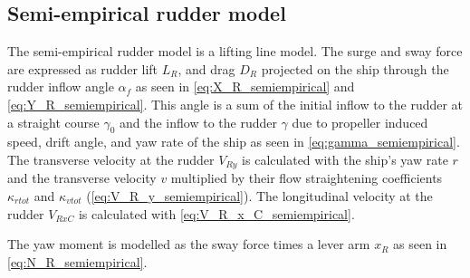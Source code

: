 \subsection{Semi-empirical rudder model}
\label{sec:semiempirical_rudder_model}
The semi-empirical rudder model is a lifting line model. The surge and sway force are expressed as rudder lift $L_R$, and drag $D_R$ projected on the ship through the rudder inflow angle $\alpha_f$ as seen in \autoref{eq:X_R_semiempirical} and \autoref{eq:Y_R_semiempirical}.
This angle is a sum of the initial inflow to the rudder at a straight course $\gamma_0$ and the inflow to the rudder $\gamma$ due to propeller induced speed, drift angle, and yaw rate of the ship as seen in \autoref{eq:gamma_semiempirical}.
\begin{equation}
    \label{eq:X_R_semiempirical}
    
\end{equation}
%
\begin{equation}
    \label{eq:Y_R_semiempirical}
    
\end{equation}
%
\begin{equation}
    \label{eq:alpha_f_semiempirical}
    
\end{equation}
%
\begin{equation}
    \label{eq:gamma_semiempirical}
    
\end{equation}
The transverse velocity at the rudder $V_{Ry}$ is calculated with the ship's yaw rate $r$ and the transverse velocity $v$ multiplied by their flow straightening coefficients $\kappa_{rtot}$ and $\kappa_{vtot}$ (\autoref{eq:V_R_y_semiempirical}). The longitudinal velocity at the rudder $V_{RxC}$ is calculated with \autoref{eq:V_R_x_C_semiempirical}.
\begin{equation}
    \label{eq:V_R_y_semiempirical}
    
\end{equation}

The yaw moment is modelled as the sway force times a lever arm $x_R$ as seen in \autoref{eq:N_R_semiempirical}.
\begin{equation}
    \label{eq:N_R_semiempirical}
    
\end{equation}

